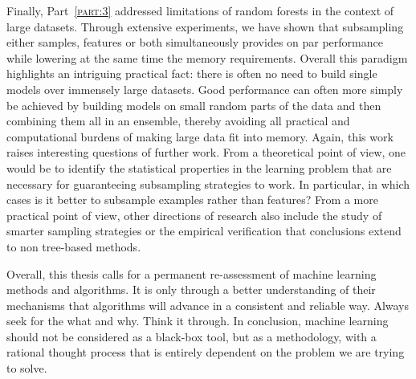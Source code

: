 Finally, Part~\textsc{\ref{part:3}} addressed limitations of random forests in
the context of large datasets. Through extensive experiments, we have shown
that subsampling either samples, features or both simultaneously provides on
par performance while lowering at the same time the memory requirements.
Overall this paradigm highlights an intriguing practical fact: there is often
no need to build single models over immensely large datasets. Good performance
can often more simply be achieved by building models on small random parts of the
data and then combining them all in an ensemble, thereby avoiding all practical and
computational burdens of making large data fit into memory. Again, this work
raises interesting questions of further work. From a theoretical point of view,
one would be to identify the statistical properties in the learning problem
that are necessary for guaranteeing subsampling strategies to work. In
particular, in which cases is it better to subsample examples rather than
features? From a more practical point of view, other directions of research
also include the study of smarter sampling strategies or the empirical
verification that conclusions extend to non tree-based methods.

Overall, this thesis calls for a permanent re-assessment of machine learning
methods and algorithms. It is only through a better understanding of their
mechanisms that algorithms will advance in a consistent and reliable way.
Always seek for the what and why. Think it through. In conclusion, machine
learning should not be considered as a black-box tool, but as a methodology,
with a rational thought process that is entirely dependent on the problem we
are trying to solve.
